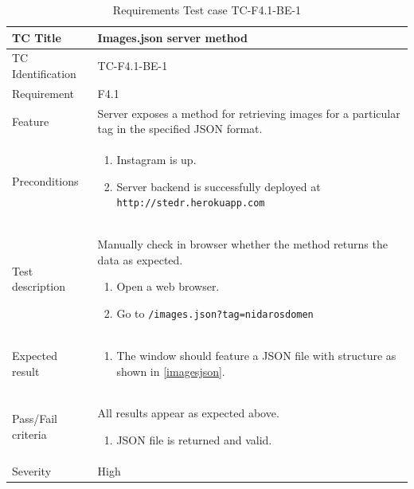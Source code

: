 \documentclass[11pt]{book}
\begin{document}
\begin{table}
  \begin{tabular}{| p{3cm} | p{9.5cm} |} \hline 
    TC Title              & Images.json server method \\ \hline 
    TC Identification     & TC-F4.1-BE-1 \\ \hline 
    Requirement           & F4.1 \\ \hline 
    Feature               & Server exposes a method for retrieving images for a particular tag in the specified JSON format. \\ \hline 
    Preconditions         & \begin{enumerate}
                              \item Instagram is up.
                              \item Server backend is successfully deployed at \texttt{http://stedr.herokuapp.com}
                            \end{enumerate} \\ \hline 

    Test description      & Manually check in browser whether the method returns the data as expected.

                            \begin{enumerate}
                              \item Open a web browser.
                              \item Go to \texttt{/images.json?tag=nidarosdomen}
                            \end{enumerate} \\ \hline 
    Expected result       & \begin{enumerate}
                              \item The window should feature a JSON file with structure as shown in \ref{imagesjson}.
                            \end{enumerate} \\ \hline 
    Pass/Fail criteria    & All results appear as expected above.
                            \begin{enumerate}
                              \item JSON file is returned and valid.
                            \end{enumerate} \\ \hline 
    Severity              & High \\ \hline 
  \end{tabular}
  \caption{Requirements Test case TC-F4.1-BE-1}
  \label{tab:TCF4.1BE1}
\end{table}
\end{document}
